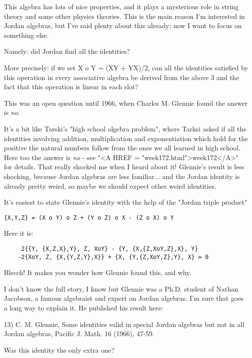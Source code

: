 This algebra has lots of nice properties, and it plays a mysterious 
role in string theory and some other physics theories.  This is the 
main reason I'm interested in Jordan algebras, but I've said plenty 
about this already; now I want to focus on something else.

Namely: did Jordan find all the identities?  

More precisely: if we set X o Y = (XY + YX)/2, can all the identities 
satisfied by this operation in every associative algebra be derived 
from the above 3 and the fact that this operation is linear in each slot?

This was an open question until 1966, when Charles M. Glennie found 
the answer is \emph{no}.


It's a bit like Tarski's "high school algebra problem", where
Tarksi asked if all the identities involving addition, multiplication
and exponentiation which hold for the positive the natural numbers
follow from the ones we all learned in high school.  Here too the answer
is \emph{no} - see "<A HREF = "week172.html">week172</A>"
for details.  That really shocked me when I heard about it!  Glennie's
result is less shocking, because Jordan algebras are less
familiar... and the Jordan identity is already pretty weird, so maybe we
should expect other weird identities.

It's easiest to state Glennie's identity with the help of
the "Jordan triple product"

\begin{verbatim}
{X,Y,Z} = (X o Y) o Z + (Y o Z) o X - (Z o X) o Y
\end{verbatim}
    
Here it is:

\begin{verbatim}
     2{{Y, {X,Z,X},Y}, Z, XoY} - {Y, {X,{Z,XoY,Z},X}, Y}
    -2{XoY, Z, {X,{Y,Z,Y},X}} + {X, {Y,{Z,XoY,Z},Y}, X} = 0 
\end{verbatim}
    
Blecch!  It makes you wonder how Glennie found this, and why.

I don't know the full story, I know but Glennie was a Ph.D. student of
Nathan Jacobson, a famous algebraist and expert on Jordan algebras.  I'm
sure that goes a long way to explain it.  He published his result here:

13) C. M. Glennie, Some identities valid in special Jordan
algebras but not in all Jordan algebras, Pacific J. Math. 16
(1966), 47-59.

Was this identity the only extra one?

